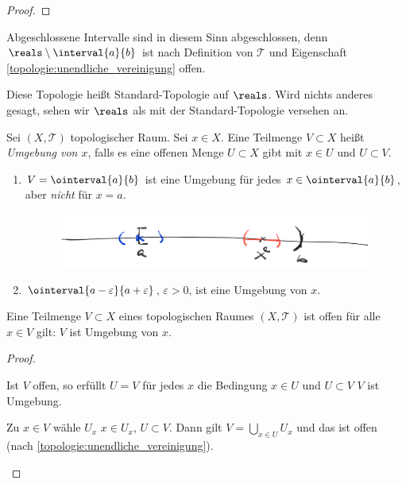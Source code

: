 \begin{beispiele}
\begin{enumerate}
\begin{proof}
            
        \end{proof}
        Abgeschlossene Intervalle sind in diesem Sinn abgeschlossen, denn \( \reals\setminus \interval{a}{b} \) ist nach Definition von \( \mathcal{T} \) und Eigenschaft \ref{topologie:unendliche_vereinigung} offen.

        Diese Topologie heißt Standard-Topologie auf \( \reals \). 
        Wird nichts anderes gesagt, sehen wir \(\reals \) als mit der Standard-Topologie versehen an.
    \end{enumerate}
\end{beispiele}
\begin{definition}\label{umgebung_in_topologischen_raeumen}
    Sei \( (X, \mathcal{T}) \) topologischer Raum. 
    Sei \( x\in X \). 
    Eine Teilmenge \( V\subset X \) heißt \emph{Umgebung von \( x \)}, falls es eine offenen Menge \( U\subset X \) gibt mit \( x\in U \) und \( U\subset V \).
\end{definition}
\begin{beispiele*}
    \begin{enumerate}
        \item \( V=\ointerval{a}{b} \) ist eine Umgebung für jedes \( x\in \ointerval{a}{b} \), aber \emph{nicht} für \( x=a \).
        \begin{figure}[H]
            \centering
            \includegraphics[width=0.7\linewidth]{figures/umgebung_beispiel_halboffenes_intervall}
            \label{fig:umgebung_beispiel_halboffenes_intervall}
        \end{figure}
        
        \item \( \ointerval{a-\varepsilon}{a+\varepsilon} \),  \( \varepsilon>0 \), ist eine Umgebung von \( x \).         
    \end{enumerate}
\end{beispiele*}
\begin{lemma}\label{offene_menge_umgebung_aller_elemente}
    Eine Teilmenge \( V\subset X \) eines topologischen Raumes \( (X,\mathcal{T}) \) ist offen \gdw für alle \( x\in V \) gilt: \( V \) ist Umgebung von \( x \).
\end{lemma}
\begin{proof}
    \begin{proofdescription}
        
        \item[\hin] Ist \( V \) offen, so erfüllt \( U=V \) für jedes \( x \) die Bedingung \( x\in U \) und \( U\subset V \) \timplies \( V \) ist Umgebung.
        \item[\rueck] Zu \( x\in V \) wähle \( U_x \) \sd \( x\in U_x \), \( U\subset V \). 
        Dann gilt \( V=\bigcup_{x\in U} U_x \) und das ist offen (nach \ref{topologie:unendliche_vereinigung}).
    \end{proofdescription}
    
    
\end{proof}
